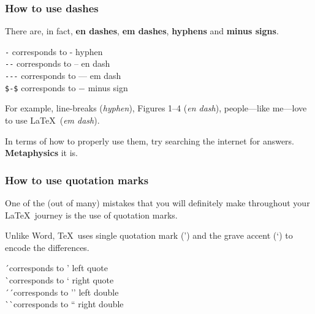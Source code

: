 \documentclass[11pt]{beamer}
\begin{document}
\begin{frame}[containsverbatim]
\frametitle{How to use dashes}

There are, in fact, \textbf{en dashes}, \textbf{em dashes}, \textbf{hyphens} and \textbf{minus signs}.

\bigskip

\centering
\verb|-| corresponds to - hyphen\\
\verb|--| corresponds to -- en dash\\
\verb|---| corresponds to --- em dash\\
\verb|$-$| corresponds to $-$ minus sign

\bigskip

\raggedright
For example, line-breaks (\textit{hyphen}), Figures 1--4 (\textit{en dash}), people---like me---love to use \LaTeX \ (\textit{em dash}). 

In terms of how to properly use them, try searching the internet for answers. \textbf{Metaphysics} it is.

\end{frame}

\begin{frame}
\frametitle{How to use quotation marks}

One of the (out of many) mistakes that you will definitely make throughout your \LaTeX \ journey is the use of quotation marks.

Unlike Word, \TeX \ uses single quotation mark (') and the grave accent (`) to encode the differences.

\bigskip

\centering
\' \ corresponds to ' left quote\\
\` \ corresponds to ` right quote\\
\' \ \' \ corresponds to '' left double\\
\` \ \` \ corresponds to `` right double

\bigskip

\raggedright

\end{frame}



\end{document}
